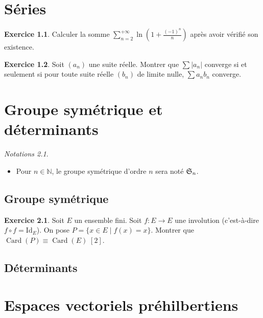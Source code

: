 \documentclass[12pt,a4paper]{book}
\theoremstyle{definition}
\newtheorem{exo}{Exercice}[section]
\theoremstyle{remark}
\newtheorem*{notation}{Notations}
\newcommand{\Id}{\mathrm{Id}}
\newcommand{\N}{\mathbb{N}}
\DeclareMathOperator{\Card}{Card}
\begin{document}
\chapter{Séries}

\begin{exo}
    Calculer la somme $\sum_{n=2}^{+\infty} \ln \left(1 + \frac{(-1)^n}{n} \right)$ après avoir vérifié son existence.
\end{exo}

\begin{exo}
    Soit $(a_n)$ une suite réelle. Montrer que $\sum |a_n|$ converge si et seulement si pour toute suite réelle $(b_n)$ de limite nulle, $\sum a_n b_n$ converge.
\end{exo}

\chapter{Groupe symétrique et déterminants}

\begin{notation}
\hspace{1pt}
\begin{itemize}
    \item Pour $n \in \N$, le groupe symétrique d'ordre $n$ sera noté $\frak{S}_n$.
\end{itemize}
\end{notation}

\section{Groupe symétrique}

\begin{exo}
    Soit $E$ un ensemble fini. Soit $f : E \to E$ une involution (c'est-à-dire $f \circ f = \Id_E$). On pose $P = \{x\in E \mid f(x) = x\}$. Montrer que $\Card (P) \equiv \Card (E) \; [2]$.
\end{exo}

\section{Déterminants}

\chapter{Espaces vectoriels préhilbertiens}
\end{document}
